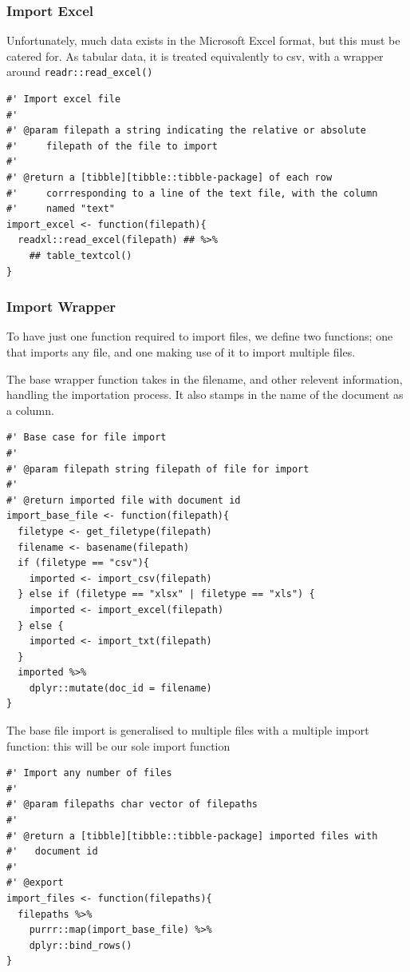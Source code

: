 \documentclass[11pt, a4paper, oneside]{report}
\begin{document}
\subsubsection{Import Excel}
\label{sec:org7535b78}
Unfortunately, much data exists in the Microsoft Excel format, but
this must be catered for. As tabular data, it is treated equivalently
to csv, with a wrapper around \texttt{readr::read_excel()}
\begin{verbatim}
#' Import excel file
#'
#' @param filepath a string indicating the relative or absolute
#'     filepath of the file to import
#'
#' @return a [tibble][tibble::tibble-package] of each row
#'     corrresponding to a line of the text file, with the column
#'     named "text"
import_excel <- function(filepath){
  readxl::read_excel(filepath) ## %>%
    ## table_textcol()
}
\end{verbatim}
\subsubsection{Import Wrapper}
\label{sec:orgf966fad}
To have just one function required to import files, we define two
functions; one that imports any file, and one making use of it to
import multiple files.

The base wrapper function takes in the
filename, and other relevent information, handling the importation
process. It also stamps in the name of the document as a column.
\begin{verbatim}
#' Base case for file import
#'
#' @param filepath string filepath of file for import
#'
#' @return imported file with document id
import_base_file <- function(filepath){
  filetype <- get_filetype(filepath)
  filename <- basename(filepath)
  if (filetype == "csv"){
    imported <- import_csv(filepath)
  } else if (filetype == "xlsx" | filetype == "xls") {
    imported <- import_excel(filepath)
  } else {
    imported <- import_txt(filepath)
  }
  imported %>%
    dplyr::mutate(doc_id = filename)
}
\end{verbatim}
The base file import is generalised to multiple files with a multiple
import function: this will be our sole import function
\begin{verbatim}
#' Import any number of files
#'
#' @param filepaths char vector of filepaths
#'
#' @return a [tibble][tibble::tibble-package] imported files with
#'   document id
#' 
#' @export
import_files <- function(filepaths){
  filepaths %>%
    purrr::map(import_base_file) %>%
    dplyr::bind_rows()
}
\end{verbatim}
\end{document}
